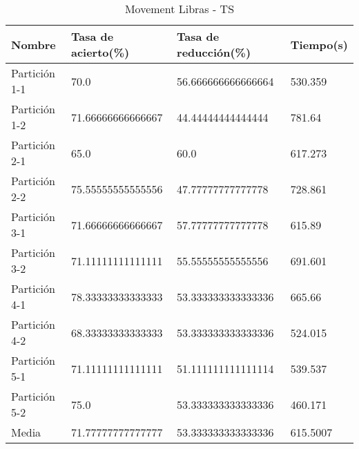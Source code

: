 \begin{table}[H]
	\centering
	\begin{tabular}{l|lll}
		Nombre        & Tasa de acierto(\%) & Tasa de reducción(\%) & Tiempo(s) \\ \hline
		Partición 1-1 & 70.0                & 56.666666666666664    & 530.359   \\
		Partición 1-2 & 71.66666666666667   & 44.44444444444444     & 781.64    \\
		Partición 2-1 & 65.0                & 60.0                  & 617.273   \\
		Partición 2-2 & 75.55555555555556   & 47.77777777777778     & 728.861   \\
		Partición 3-1 & 71.66666666666667   & 57.77777777777778     & 615.89    \\
		Partición 3-2 & 71.11111111111111   & 55.55555555555556     & 691.601   \\
		Partición 4-1 & 78.33333333333333   & 53.333333333333336    & 665.66    \\
		Partición 4-2 & 68.33333333333333   & 53.333333333333336    & 524.015   \\
		Partición 5-1 & 71.11111111111111   & 51.111111111111114    & 539.537   \\
		Partición 5-2 & 75.0                & 53.333333333333336    & 460.171   \\ \hline
		Media         & 71.77777777777777   & 53.333333333333336    & 615.5007 
	\end{tabular}
	\caption{Movement Libras - TS}
	\label{MLIB-TS}
\end{table}